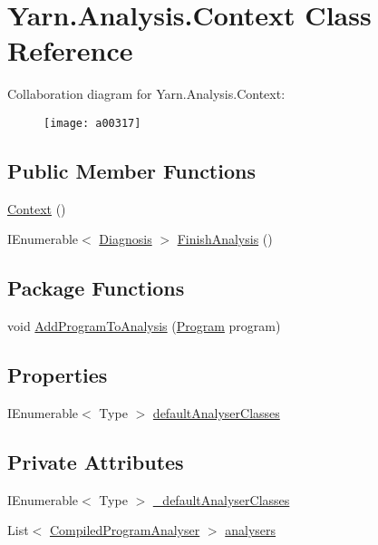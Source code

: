\hypertarget{a00031}{\section{Yarn.\-Analysis.\-Context Class Reference}
\label{a00031}
}


Collaboration diagram for Yarn.\-Analysis.\-Context\-:
\nopagebreak
\begin{figure}[H]
\begin{center}
\leavevmode
\texttt{[image: a00317]}
\end{center}
\end{figure}
\subsection*{Public Member Functions}
\begin{DoxyCompactItemize}
\item 
\hyperlink{a00031_a8e2c56843e8d374b0f90e23326d8d14a}{Context} ()
\item 
I\-Enumerable$<$ \hyperlink{a00035}{Diagnosis} $>$ \hyperlink{a00031_a1eadea062a5899a64d00ea0172cbbb43}{Finish\-Analysis} ()
\end{DoxyCompactItemize}
\subsection*{Package Functions}
\begin{DoxyCompactItemize}
\item 
void \hyperlink{a00031_a60255a6d54f296d199507acef251244c}{Add\-Program\-To\-Analysis} (\hyperlink{a00067}{Program} program)
\end{DoxyCompactItemize}
\subsection*{Properties}
\begin{DoxyCompactItemize}
\item 
I\-Enumerable$<$ Type $>$ \hyperlink{a00031_afdf24f2512251c2203ba1bde8f4a0f90}{default\-Analyser\-Classes}
\end{DoxyCompactItemize}
\subsection*{Private Attributes}
\begin{DoxyCompactItemize}
\item 
I\-Enumerable$<$ Type $>$ \hyperlink{a00031_ad06829cf848a5936db5724ebced758ec}{\-\_\-default\-Analyser\-Classes}
\item 
List$<$ \hyperlink{a00028}{Compiled\-Program\-Analyser} $>$ \hyperlink{a00031_aa5c7eaa90ad9c47969a3b336080d8991}{analysers}
\end{DoxyCompactItemize}


